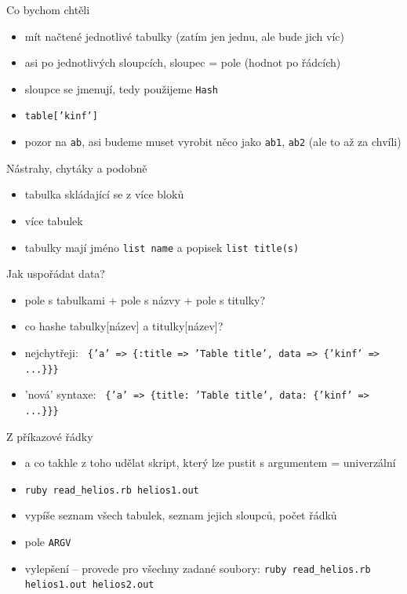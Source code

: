 \documentclass{beamer}
\begin{document}
\begin{frame}{Co bychom chtěli}
  \begin{itemize}
    \item mít načtené jednotlivé tabulky (zatím jen jednu, ale bude jich víc)
    \item asi po jednotlivých sloupcích, sloupec = pole (hodnot po řádcích)
    \item sloupce se jmenují, tedy použijeme \texttt{Hash}
    \item \texttt{table['kinf']}
    \item pozor na \texttt{ab}, asi budeme muset vyrobit něco jako \texttt{ab1}, \texttt{ab2} (ale to až za chvíli)
  \end{itemize}
\end{frame}

\begin{frame}{Nástrahy, chytáky a podobně}
  \begin{itemize}
    \item tabulka skládající se z více bloků
    \item více tabulek
    \item tabulky mají jméno \texttt{list name} a popisek \texttt{list title(s)}
  \end{itemize}
\end{frame}

\begin{frame}{Jak uspořádat data?}
  \begin{itemize}
    \item pole s tabulkami + pole s názvy + pole s titulky?
    \pause
    \item co hashe tabulky[název] a titulky[název]?
    \pause
    \item nejchytřeji: \texttt{ \{'a' => \{:title => 'Table title', data => \{'kinf' => ...\}\}\} }
    \pause
    \item 'nová' syntaxe: \texttt{ \{'a' => \{title: 'Table title', data: \{'kinf' => ...\}\}\} }
  \end{itemize}
\end{frame}

\begin{frame}{Z příkazové řádky}
  \begin{itemize}
    \item a co takhle z toho udělat skript, který lze pustit s argumentem = univerzální
    \item \texttt{ruby read\_helios.rb helios1.out}
    \item vypíše seznam všech tabulek, seznam jejich sloupců, počet řádků
    \item pole \texttt{ARGV}
    \item vylepšení – provede pro všechny zadané soubory: \texttt{ruby read\_helios.rb helios1.out helios2.out}
  \end{itemize}
\end{frame}
\end{document}
